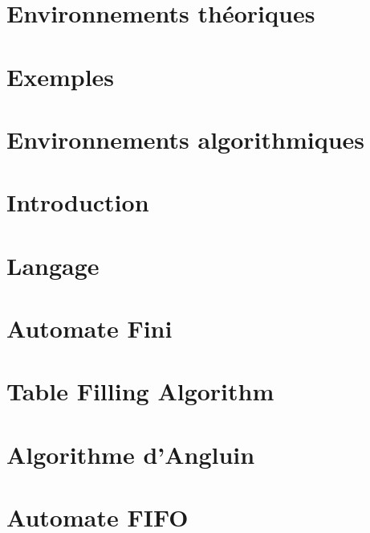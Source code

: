 

\newcommand{\student}{Benjamin André}
\newcommand{\grade}{MAB2 Sciences Informatiques}
\newcommand{\director}{Véronique Bruyère}
\renewcommand{\title}{Apprentissage actif d'automates}
\renewcommand{\date}{\today}



	

	\tableofcontents
	\newpage

	\section*{Environnements théoriques}

	\section*{Exemples}

	\section*{Environnements algorithmiques}

	\newpage

	\section{Introduction}\label{sec:intro}

	\section{Langage}\label{sec:langage}
	\section{Automate Fini}\label{sec:automaton}
	\section{Table Filling Algorithm}\label{sec:tfa}
	\section{Algorithme d'Angluin}\label{sec:angluin}
	\section{Automate FIFO}\label{sec:fifo}

	\newpage
	
	


